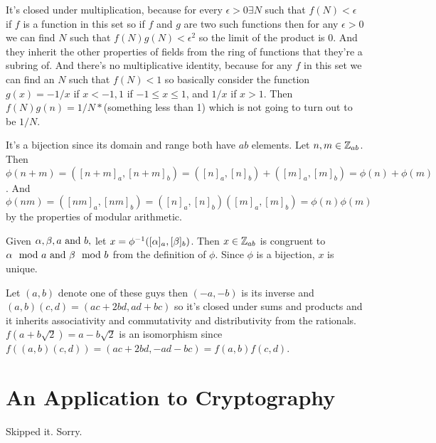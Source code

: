 \documentclass[11pt, oneside]{article}   	%
\begin{document}
\item It's closed under multiplication, because for every $\epsilon > 0 \exists N$ such that $f(N) < \epsilon$ if $f$ is a function in this set so if $f$ and $g$ are two such functions then for any $\epsilon > 0$ we can find $N$ such that $f(N)g(N) < \epsilon^2$ so the limit of the product is 0. And they inherit the other properties of fields from the ring of functions that they're a subring of. And there's no multiplicative identity, because for any $f$ in this set we can find an $N$ such that $f(N) < 1$ so basically consider the function $g(x) = -1/x$ if $x < -1, 1$ if $-1 \le x \le 1$, and $1/x$ if $x > 1$. Then  $f(N)g(n) = 1/N * $(something less than 1) which is not going to turn out to be $1/N$.
\item It's a bijection since its domain and range both have $ab$ elements. Let $n, m \in \mathbb{Z}_{ab}$. Then $\phi(n + m) = ([n + m]_a, [n + m]_b) = ([n]_a, [n]_b) + ([m]_a,[m]_b) = \phi(n) + \phi(m)$. And $\phi(nm) = ([nm]_a, [nm]_b) = ([n]_a, [n]_b)([m]_a,[m]_b) = \phi(n)\phi(m)$ by the properties of modular arithmetic.
\item Given $\alpha, \beta, a \text{ and } b,$ let $x = \phi^{-1}([\alpha]_a,[\beta]_b)$. Then $x \in \mathbb{Z}_{ab}$ is congruent to $\alpha \mod a \text{ and } \beta \mod b$ from the definition of $\phi$. Since $\phi$ is a bijection, $x$ is unique.
\item Let $(a, b)$ denote one of these guys then $(-a, -b)$ is its inverse and $(a, b)(c, d) = (ac + 2bd, ad + bc)$ so it's closed under sums and products and it inherits associativity and commutativity and distributivity from the rationals. $f(a + b\sqrt{2}) = a - b\sqrt{2}$ is an isomorphism since $f((a, b)(c, d)) = (ac + 2bd, -ad - bc) = f(a, b)f(c, d)$. 
\ee
\section{An Application to Cryptography}
Skipped it. Sorry.
\end{document}
